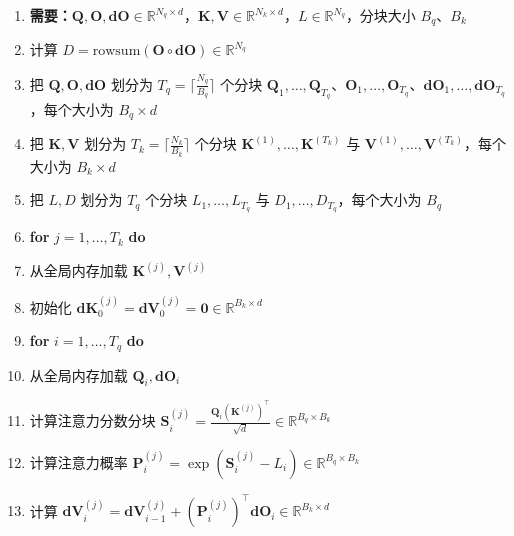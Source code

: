 \begin{enumerate}[label=\arabic*., leftmargin=2.2em, itemsep=1pt, parsep=0pt]
  \item \textbf{需要：}$\boldsymbol{Q}, \boldsymbol{O}, \boldsymbol{dO} \in \mathbb{R}^{N_q \times d}$，$\boldsymbol{K}, \boldsymbol{V} \in \mathbb{R}^{N_k \times d}$，$L \in \mathbb{R}^{N_q}$，分块大小 $B_q$、$B_k$
  \item 计算 $D = \mathrm{rowsum}(\boldsymbol{O} \circ \boldsymbol{dO}) \in \mathbb{R}^{N_q}$
  \item 把 $\boldsymbol{Q}, \boldsymbol{O}, \boldsymbol{dO}$ 划分为 $T_q = \lceil \frac{N_q}{B_q} \rceil$ 个分块 $\boldsymbol{Q}_1, \dots, \boldsymbol{Q}_{T_q}$、$\boldsymbol{O}_1, \dots, \boldsymbol{O}_{T_q}$、$\boldsymbol{dO}_1, \dots, \boldsymbol{dO}_{T_q}$，每个大小为 $B_q \times d$
  \item 把 $\boldsymbol{K}, \boldsymbol{V}$ 划分为 $T_k = \lceil \frac{N_k}{B_k} \rceil$ 个分块 $\boldsymbol{K}^{(1)}, \dots, \boldsymbol{K}^{(T_k)}$ 与 $\boldsymbol{V}^{(1)}, \dots, \boldsymbol{V}^{(T_k)}$，每个大小为 $B_k \times d$
  \item 把 $L, D$ 划分为 $T_q$ 个分块 $L_1, \dots, L_{T_q}$ 与 $D_1, \dots, D_{T_q}$，每个大小为 $B_q$
  \item \textbf{for} $j = 1, \dots, T_k$ \textbf{do}
  \item \hspace*{1.6em}从全局内存加载 $\boldsymbol{K}^{(j)}, \boldsymbol{V}^{(j)}$
  \item \hspace*{1.6em}初始化 $\boldsymbol{dK}_0^{(j)} = \boldsymbol{dV}_0^{(j)} = \boldsymbol{0} \in \mathbb{R}^{B_k \times d}$
  \item \hspace*{1.6em}\textbf{for} $i = 1, \dots, T_q$ \textbf{do}
  \item \hspace*{3.2em}从全局内存加载 $\boldsymbol{Q}_i, \boldsymbol{dO}_i$
  \item \hspace*{3.2em}计算注意力分数分块 $\boldsymbol{S}_i^{(j)} = \frac{\boldsymbol{Q}_i (\boldsymbol{K}^{(j)})^{\top}}{\sqrt{d}} \in \mathbb{R}^{B_q \times B_k}$
  \item \hspace*{3.2em}计算注意力概率 $\boldsymbol{P}_i^{(j)} = \exp\left(\boldsymbol{S}_i^{(j)} - L_i\right) \in \mathbb{R}^{B_q \times B_k}$
  \item \hspace*{3.2em}计算 $\boldsymbol{dV}_i^{(j)} = \boldsymbol{dV}_{i-1}^{(j)} + \left(\boldsymbol{P}_i^{(j)}\right)^{\top} \boldsymbol{dO}_i \in \mathbb{R}^{B_k \times d}$

\end{enumerate}
